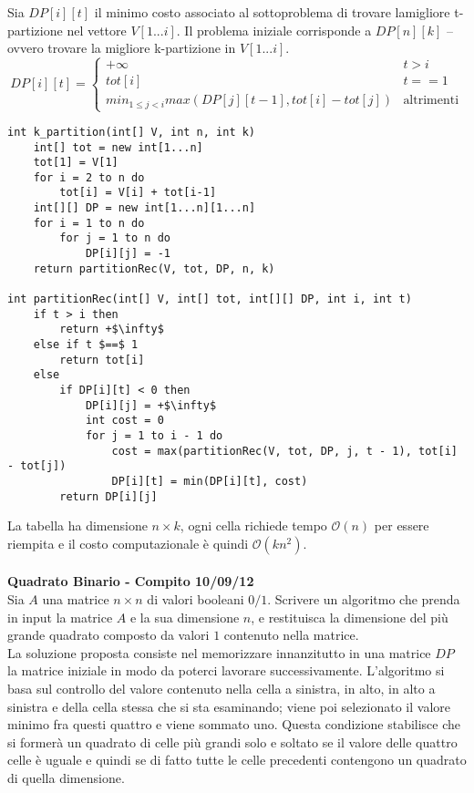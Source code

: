 \documentclass[../cheatSheetAlgoritmi.tex]{subfiles}
\begin{document}
Sia $DP[i][t]$ il minimo costo associato al sottoproblema di trovare lamigliore t-partizione nel vettore $V[1...i]$. Il problema iniziale corrisponde a $DP[n][k]$ – ovvero trovare la migliore k-partizione in $V[1...i]$.
\begin{equation*}
    DP[i][t]=\begin{cases}
        +\infty & \text{$t > i$}\\
        tot[i] & \text{$t == 1$} \\
        min_{1 \leq j < i}max(DP[j][t-1], tot[i] - tot[j]) & \text{altrimenti}
    \end{cases}
\end{equation*}
\begin{lstlisting}[caption=k-partizioni]
int k_partition(int[] V, int n, int k)
	int[] tot = new int[1...n]
	tot[1] = V[1]
	for i = 2 to n do
		tot[i] = V[i] + tot[i-1]
	int[][] DP = new int[1...n][1...n]
	for i = 1 to n do
		for j = 1 to n do
			DP[i][j] = -1
	return partitionRec(V, tot, DP, n, k)
	
int partitionRec(int[] V, int[] tot, int[][] DP, int i, int t)
	if t > i then
		return +$\infty$
	else if t $==$ 1
		return tot[i]
	else
		if DP[i][t] < 0 then
			DP[i][j] = +$\infty$
			int cost = 0
			for j = 1 to i - 1 do
				cost = max(partitionRec(V, tot, DP, j, t - 1), tot[i] - tot[j])
				DP[i][t] = min(DP[i][t], cost)
		return DP[i][j]
\end{lstlisting}
La tabella ha dimensione $n \times k$, ogni cella richiede tempo $\mathcal{O}(n)$ per essere riempita e il costo computazionale è quindi $\mathcal{O}(kn^{2})$.\\\\
\textbf{Quadrato Binario - Compito 10/09/12}\\
Sia $A$ una matrice $n \times n$ di valori booleani $0/1$. Scrivere un algoritmo che prenda in input la matrice $A$ e la sua dimensione $n$, e restituisca la dimensione del più grande quadrato composto da valori $1$ contenuto nella matrice.\\
La soluzione proposta consiste nel memorizzare innanzitutto in una matrice $DP$ la matrice iniziale in modo da poterci lavorare successivamente. L'algoritmo si basa sul controllo del valore contenuto nella cella a sinistra, in alto, in alto a sinistra e della cella stessa che si sta esaminando; viene poi selezionato il valore minimo fra questi quattro e viene sommato uno. Questa condizione stabilisce che si formerà un quadrato di celle più grandi solo e soltato se il valore delle quattro celle è uguale e quindi se di fatto tutte le celle precedenti contengono un quadrato di quella dimensione.
\end{document}
